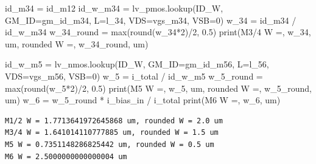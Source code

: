 \documentclass[
  a4paper,
  DIV=11,
  numbers=noendperiod]{scrartcl}
\newenvironment{Shaded}{\begin{snugshade}}{\end{snugshade}}
\newcommand{\BuiltInTok}[1]{\textcolor[rgb]{0.00,0.23,0.31}{#1}}
\newcommand{\DecValTok}[1]{\textcolor[rgb]{0.68,0.00,0.00}{#1}}
\newcommand{\FloatTok}[1]{\textcolor[rgb]{0.68,0.00,0.00}{#1}}
\newcommand{\NormalTok}[1]{\textcolor[rgb]{0.00,0.23,0.31}{#1}}
\newcommand{\OperatorTok}[1]{\textcolor[rgb]{0.37,0.37,0.37}{#1}}
\newcommand{\StringTok}[1]{\textcolor[rgb]{0.13,0.47,0.30}{#1}}
\begin{document}
\begin{tcolorbox}
\begin{Shaded}
\begin{Highlighting}[]
\NormalTok{id\_m34 }\OperatorTok{=}\NormalTok{ id\_m12}
\NormalTok{id\_w\_m34 }\OperatorTok{=}\NormalTok{ lv\_pmos.lookup(}\StringTok{\textquotesingle{}ID\_W\textquotesingle{}}\NormalTok{, GM\_ID}\OperatorTok{=}\NormalTok{gm\_id\_m34, L}\OperatorTok{=}\NormalTok{l\_34, VDS}\OperatorTok{=}\NormalTok{vgs\_m34, VSB}\OperatorTok{=}\DecValTok{0}\NormalTok{)}
\NormalTok{w\_34 }\OperatorTok{=}\NormalTok{ id\_m34 }\OperatorTok{/}\NormalTok{ id\_w\_m34}
\NormalTok{w\_34\_round }\OperatorTok{=} \BuiltInTok{max}\NormalTok{(}\BuiltInTok{round}\NormalTok{(w\_34}\OperatorTok{*}\DecValTok{2}\NormalTok{)}\OperatorTok{/}\DecValTok{2}\NormalTok{, }\FloatTok{0.5}\NormalTok{) }
\BuiltInTok{print}\NormalTok{(}\StringTok{\textquotesingle{}M3/4 W =\textquotesingle{}}\NormalTok{, w\_34, }\StringTok{\textquotesingle{}um, rounded W =\textquotesingle{}}\NormalTok{, w\_34\_round, }\StringTok{\textquotesingle{}um\textquotesingle{}}\NormalTok{)}

\NormalTok{id\_w\_m5 }\OperatorTok{=}\NormalTok{ lv\_nmos.lookup(}\StringTok{\textquotesingle{}ID\_W\textquotesingle{}}\NormalTok{, GM\_ID}\OperatorTok{=}\NormalTok{gm\_id\_m56, L}\OperatorTok{=}\NormalTok{l\_56, VDS}\OperatorTok{=}\NormalTok{vgs\_m56, VSB}\OperatorTok{=}\DecValTok{0}\NormalTok{)}
\NormalTok{w\_5 }\OperatorTok{=}\NormalTok{ i\_total }\OperatorTok{/}\NormalTok{ id\_w\_m5}
\NormalTok{w\_5\_round }\OperatorTok{=} \BuiltInTok{max}\NormalTok{(}\BuiltInTok{round}\NormalTok{(w\_5}\OperatorTok{*}\DecValTok{2}\NormalTok{)}\OperatorTok{/}\DecValTok{2}\NormalTok{, }\FloatTok{0.5}\NormalTok{)}
\BuiltInTok{print}\NormalTok{(}\StringTok{\textquotesingle{}M5 W =\textquotesingle{}}\NormalTok{, w\_5, }\StringTok{\textquotesingle{}um, rounded W =\textquotesingle{}}\NormalTok{, w\_5\_round, }\StringTok{\textquotesingle{}um\textquotesingle{}}\NormalTok{)}
\NormalTok{w\_6 }\OperatorTok{=}\NormalTok{ w\_5\_round }\OperatorTok{*}\NormalTok{ i\_bias\_in }\OperatorTok{/}\NormalTok{ i\_total}
\BuiltInTok{print}\NormalTok{(}\StringTok{\textquotesingle{}M6 W =\textquotesingle{}}\NormalTok{, w\_6, }\StringTok{\textquotesingle{}um\textquotesingle{}}\NormalTok{)}
\end{Highlighting}
\end{Shaded}

\begin{verbatim}
M1/2 W = 1.7713641972645868 um, rounded W = 2.0 um
M3/4 W = 1.641014110777885 um, rounded W = 1.5 um
M5 W = 0.7351148286825442 um, rounded W = 0.5 um
M6 W = 2.5000000000000004 um
\end{verbatim}


\end{tcolorbox}
\end{document}
